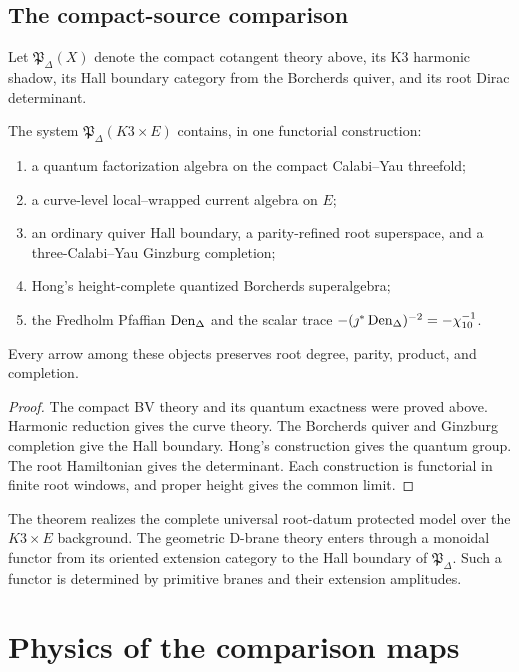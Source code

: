 \chapter{The compact-source comparison}
Let $\mathfrak P_\Delta(X)$ denote the compact cotangent theory above, its K3 harmonic shadow, its Hall boundary category from the Borcherds quiver, and its root Dirac determinant.

\begin{theorem}
The system $\mathfrak P_\Delta(K3\times E)$ contains, in one functorial construction:
\begin{enumerate}
\item a quantum factorization algebra on the compact Calabi--Yau threefold;
\item a curve-level local--wrapped current algebra on $E$;
\item an ordinary quiver Hall boundary, a parity-refined root superspace, and a three-Calabi--Yau Ginzburg completion;
\item Hong's height-complete quantized Borcherds superalgebra;
\item the Fredholm Pfaffian $\operatorname{Den}_{\Delta}$ and the scalar trace $-(\jmath^*\operatorname{Den}_{\Delta})^{-2}=-\chi_{10}^{-1}$.
\end{enumerate}
Every arrow among these objects preserves root degree, parity, product, and completion.
\end{theorem}
\begin{proof}
The compact BV theory and its quantum exactness were proved above.  Harmonic reduction gives the curve theory.  The Borcherds quiver and Ginzburg completion give the Hall boundary.  Hong's construction gives the quantum group.  The root Hamiltonian gives the determinant.  Each construction is functorial in finite root windows, and proper height gives the common limit.
\end{proof}

The theorem realizes the complete universal root-datum protected model over the $K3\times E$ background.  The geometric D-brane theory enters through a monoidal functor from its oriented extension category to the Hall boundary of $\mathfrak P_\Delta$.  Such a functor is determined by primitive branes and their extension amplitudes.


\part[Physics]{Physics of the comparison maps}

